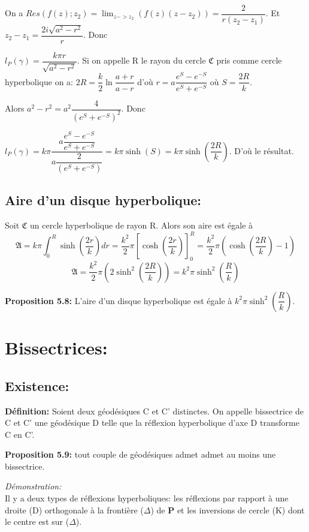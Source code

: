 \documentclass[a4paper, 12pt, twoside]{book}
\begin{document}
   On a $ Res(f(z); z_{2})=\lim_{z->z_{2}}(f(z)(z-z_{2}))=\dfrac{2}{r(z_{2}-z_{1})}$. Et $z_{2}-z_{1}=\dfrac{2i\sqrt{a^{2}-r^{2}}}{r}$. Donc\
   
  $l_{P}(\gamma)=\dfrac{k\pi r}{\sqrt{a^{2}-r^{2}}}$. Si on appelle R le rayon du cercle $\mathfrak{C}$ pris comme cercle hyperbolique on a: $2R=\dfrac{k}{2}\ln\dfrac{a+r}{a-r}$ d'où $r=a\dfrac{e^{S}-e^{-S}}{e^{S}+e^{-S}}$ où $S=\dfrac{2R}{k}$.\
  
  Alors $a^{2}-r^{2}=a^{2}\dfrac{4}{(e^{S}+e^{-S})^{2}}$. Donc\
  
   $l_{P}(\gamma)=k\pi\dfrac{a\dfrac{e^{S}-e^{-S}}{e^{S}+e^{-S}}}{a\dfrac{2}{(e^{S}+e^{-S})}}=k\pi \sinh(S)=k\pi \sinh(\dfrac{2R}{k})$. D'où le résultat.
   
   
 

\subsection{Aire d'un disque hyperbolique:}

 
 Soit $\mathfrak{C}$ un cercle hyperbolique de rayon R. Alors son aire est égale à 
 $$\mathfrak{A}=k\pi\int_{0}^{R} \sinh(\dfrac{2r}{k})dr=\dfrac{k^{2}}{2}\pi[\cosh(\dfrac{2r}{k})]_{0}^{R}=\dfrac{k^{2}}{2}\pi(\cosh(\dfrac{2R}{k})-1)$$
 $$\mathfrak{A}=\dfrac{k^{2}}{2}\pi(2\sinh^{2}(\dfrac{2R}{k}))=k^{2}\pi\sinh^{2}(\dfrac{R}{k})$$
 
 
\textbf{Proposition 5.8:} L'aire d'un disque hyperbolique est égale à $k^{2}\pi\sinh^{2}(\dfrac{R}{k})$.\\

\section{Bissectrices:}

\subsection{Existence:}

 

\textbf{Définition:} Soient deux géodésiques C et C' distinctes. On appelle bissectrice de C et C' une géodésique D telle que la réflexion hyperbolique d'axe D transforme C en C'.

\textbf{Proposition 5.9:} tout couple de géodésiques admet admet au moins une  bissectrice.

\textit{Démonstration:}\\

Il y a deux types de réflexions hyperboliques: les réflexions par rapport à une droite (D) orthogonale à la frontière ($\Delta$) de \textbf{P} et les inversions de cercle (K) dont le centre est sur ($\Delta$).\\
\end{document}
